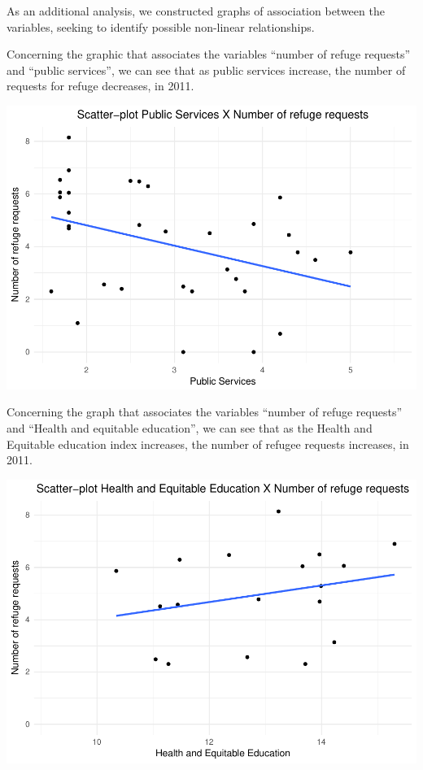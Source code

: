 \documentclass[]{elsarticle} %
\makeatletter
\def\maxwidth{\ifdim\Gin@nat@width>\linewidth\linewidth
\else\Gin@nat@width\fi}
\let\Oldincludegraphics\includegraphics
\renewcommand{\includegraphics}[1]{\Oldincludegraphics[width=\maxwidth]{#1}}
\makeatother
\begin{document}
As an additional analysis, we constructed graphs of association between
the variables, seeking to identify possible non-linear relationships.

Concerning the graphic that associates the variables ``number of refuge
requests'' and ``public services'', we can see that as public services
increase, the number of requests for refuge decreases, in 2011.

\includegraphics{stephanie-moura-rmarkdown-tf-ad-ufpe-2018_files/figure-latex/model_1_1-1.pdf}

Concerning the graph that associates the variables ``number of refuge
requests'' and ``Health and equitable education'', we can see that as
the Health and Equitable education index increases, the number of
refugee requests increases, in 2011.

\includegraphics{stephanie-moura-rmarkdown-tf-ad-ufpe-2018_files/figure-latex/model_1_2-1.pdf}
\end{document}
